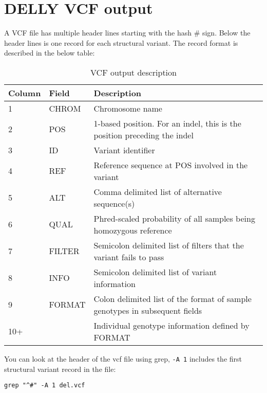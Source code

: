 \section{DELLY VCF output}

\begin{information}
A VCF file has multiple header lines starting with the hash \# sign. Below the header lines is one record for each structural variant. The record format is described in the below table:

\begin{table}[H]
  \centering
  \caption{VCF output description}
    \begin{tabular}{lll}
    \toprule
    Column & Field & Description \\
    \midrule
    1 & CHROM & Chromosome name \\
    2 & POS & 1-based position. For an indel, this is the position preceding the indel \\
    3 & ID & Variant identifier \\
    4 & REF & Reference sequence at POS involved in the variant \\
    5 & ALT & Comma delimited list of alternative sequence(s) \\
    6 & QUAL & Phred-scaled probability of all samples being homozygous reference \\
    7 & FILTER & Semicolon delimited list of filters that the variant fails to pass \\
    8 & INFO & Semicolon delimited list of variant information \\
    9 & FORMAT & Colon delimited list of the format of sample genotypes in subsequent fields \\
    10+ & & Individual genotype information defined by FORMAT \\
    \bottomrule
    \end{tabular}
  \label{tab:vcfoutput}
\end{table}


\end{information}
\begin{steps}
You can look at the header of the vcf file using grep, \texttt{-A 1} includes the first structural variant record in the file:

\begin{lstlisting}
grep "^#" -A 1 del.vcf
\end{lstlisting}
\end{steps}

